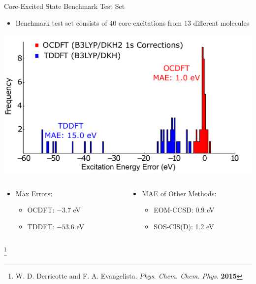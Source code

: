 \documentclass[t]{beamer}
\newcommand\blfootnote[1]{%
  \begingroup
  \renewcommand\thefootnote{}\footnote{#1}%
  \addtocounter{footnote}{-1}%
  \endgroup
}
\begin{document}
\begin{frame}{Core-Excited State Benchmark Test Set}
\begin{itemize}
\item Benchmark test set consists of 40 core-excitations from 13 different molecules
\end{itemize}
\centering
\includegraphics[scale=0.85]{ocdft_tddft_histogram.pdf}
\begin{columns}
\begin{column}{0.5\textwidth}
\begin{itemize}
\item Max Errors:
		\begin{itemize}
		\item OCDFT: $-3.7$ eV
		\item TDDFT: $-53.6$ eV
		\end{itemize}
\end{itemize}
\end{column}
\begin{column}{0.5\textwidth}
\begin{itemize}
\item MAE of Other Methods:
		\begin{itemize}
		\item EOM-CCSD: 0.9 eV
		\item SOS-CIS(D): 1.2 eV
		\end{itemize}
\end{itemize}
\end{column}
\end{columns}
\blfootnote{W. D. Derricotte and F. A. Evangelista. \textit{Phys. Chem. Chem. Phys.} \textbf{2015}}
\end{frame}
\end{document}
